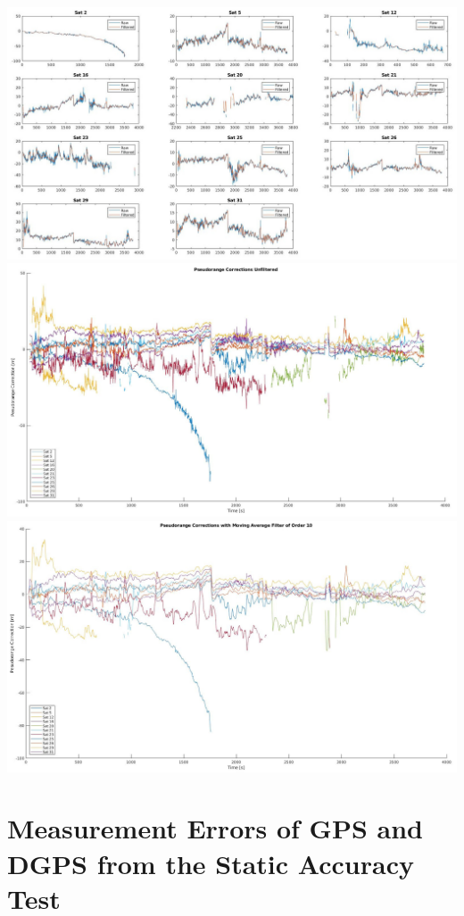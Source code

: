 \begin{centering}
 \includegraphics[width=\textwidth]{appendix/C_Matlab/PRCs_single.jpg}
 \includegraphics[width=\textwidth]{appendix/C_Matlab/PRCs_unfiltered.jpg}
 \includegraphics[width=\textwidth]{appendix/C_Matlab/PRCs_filtered.jpg}
\end{centering}

\newpage

\section{Measurement Errors of GPS and DGPS from the Static Accuracy Test}

